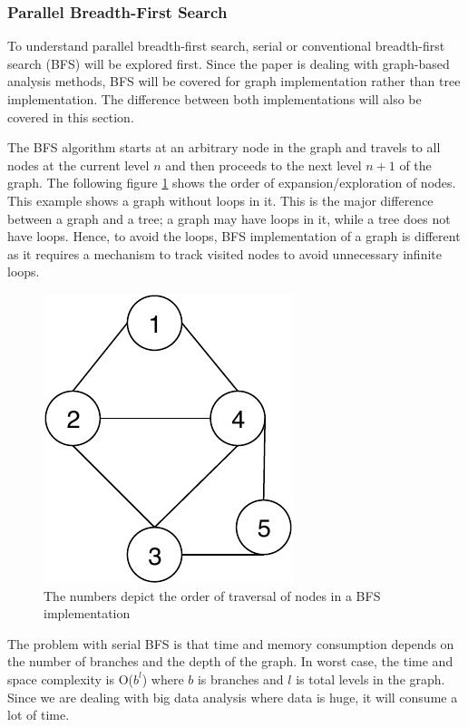 \documentclass[journal,twoside,web]{ieeecolor}
\begin{document}
\subsubsection{Parallel Breadth-First Search}
To understand parallel breadth-first search, serial or conventional breadth-first search (BFS) will be explored first. Since the paper is dealing with graph-based analysis methods, BFS will be covered for graph implementation rather than tree implementation. The difference between both implementations will also be covered in this section.

The BFS algorithm starts at an arbitrary node in the graph and travels to all nodes at the current level $n$ and then proceeds to the next level $n + 1$ of the graph. The following figure \ref{fig1} shows the order of expansion/exploration of nodes. This example shows a graph without loops in it. This is the major difference between a graph and a tree; a graph may have loops in it, while a tree does not have loops. Hence, to avoid the loops, BFS implementation of a graph is different as it requires a mechanism to track visited nodes to avoid unnecessary infinite loops.

\begin{figure}[!h]
    \centerline{\includegraphics[scale=1]{figures/bfs.pdf}}
    \caption{The numbers depict the order of traversal of nodes in a BFS implementation}
    \label{fig1}
\end{figure}

The problem with serial BFS is that time and memory consumption depends on the number of branches and the depth of the graph. In worst case, the time and space complexity is O($b^l$) where ${b}$ is branches and ${l}$ is total levels in the graph. Since we are dealing with big data analysis where data is huge, it will consume a lot of time.
\end{document}
